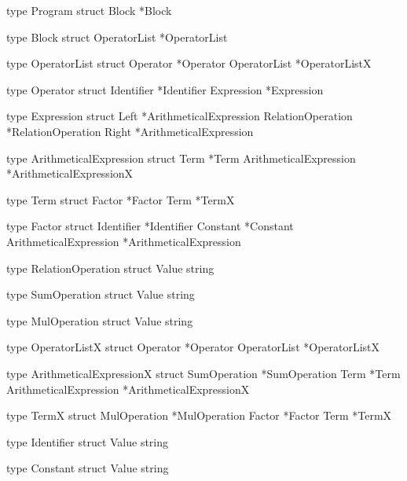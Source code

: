 type Program struct {
	Block *Block
}

type Block struct {
	OperatorList *OperatorList
}

type OperatorList struct {
	Operator     *Operator
	OperatorList *OperatorListX
}

type Operator struct {
	Identifier *Identifier
	Expression *Expression
}

type Expression struct {
	Left              *ArithmeticalExpression
	RelationOperation *RelationOperation
	Right             *ArithmeticalExpression
}

type ArithmeticalExpression struct {
	Term                   *Term
	ArithmeticalExpression *ArithmeticalExpressionX
}

type Term struct {
	Factor *Factor
	Term   *TermX
}

type Factor struct {
	Identifier             *Identifier
	Constant               *Constant
	ArithmeticalExpression *ArithmeticalExpression
}

type RelationOperation struct {
	Value string
}

type SumOperation struct {
	Value string
}

type MulOperation struct {
	Value string
}

type OperatorListX struct {
	Operator     *Operator
	OperatorList *OperatorListX
}

type ArithmeticalExpressionX struct {
	SumOperation           *SumOperation
	Term                   *Term
	ArithmeticalExpression *ArithmeticalExpressionX
}

type TermX struct {
	MulOperation *MulOperation
	Factor       *Factor
	Term         *TermX
}

type Identifier struct {
	Value string
}

type Constant struct {
	Value string
}